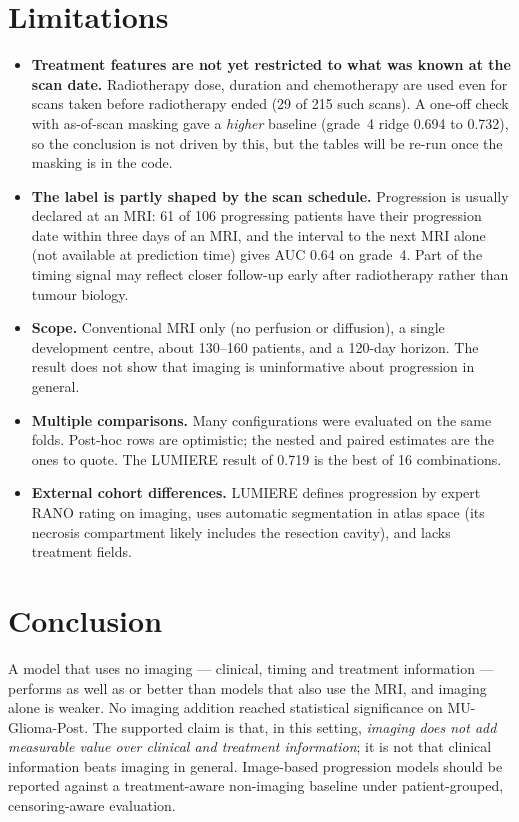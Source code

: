 \documentclass[11pt,a4paper]{article}
\begin{document}
\section{Limitations}
\begin{itemize}
\item \textbf{Treatment features are not yet restricted to what was known at the scan date.} Radiotherapy dose, duration
and chemotherapy are used even for scans taken before radiotherapy ended (29 of 215 such scans). A one-off check with
as-of-scan masking gave a \emph{higher} baseline (grade~4 ridge 0.694 to 0.732), so the conclusion is not driven by this,
but the tables will be re-run once the masking is in the code.
\item \textbf{The label is partly shaped by the scan schedule.} Progression is usually declared at an MRI: 61 of 106
progressing patients have their progression date within three days of an MRI, and the interval to the next MRI alone
(not available at prediction time) gives AUC 0.64 on grade~4. Part of the timing signal may reflect closer follow-up
early after radiotherapy rather than tumour biology.
\item \textbf{Scope.} Conventional MRI only (no perfusion or diffusion), a single development centre, about 130--160
patients, and a 120-day horizon. The result does not show that imaging is uninformative about progression in general.
\item \textbf{Multiple comparisons.} Many configurations were evaluated on the same folds. Post-hoc rows are optimistic;
the nested and paired estimates are the ones to quote. The LUMIERE result of 0.719 is the best of 16 combinations.
\item \textbf{External cohort differences.} LUMIERE defines progression by expert RANO rating on imaging, uses
automatic segmentation in atlas space (its necrosis compartment likely includes the resection cavity), and lacks
treatment fields.
\end{itemize}

\section{Conclusion}
A model that uses no imaging --- clinical, timing and treatment information --- performs as well as or better than models
that also use the MRI, and imaging alone is weaker. No imaging addition reached statistical significance on
MU-Glioma-Post. The supported claim is that, in this setting, \emph{imaging does not add measurable value over clinical
and treatment information}; it is not that clinical information beats imaging in general. Image-based progression
models should be reported against a treatment-aware non-imaging baseline under patient-grouped, censoring-aware
evaluation.
\end{document}
